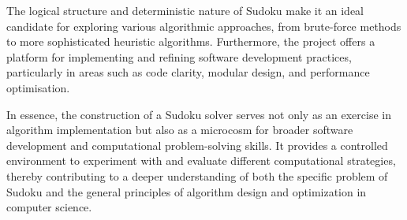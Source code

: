 \documentclass[11pt]{article}
\begin{document}
The logical structure and deterministic nature of Sudoku make it an ideal candidate for exploring various algorithmic approaches, from brute-force methods to more sophisticated heuristic algorithms. Furthermore, the project offers a platform for implementing and refining software development practices, particularly in areas such as code clarity, modular design, and performance optimisation.

In essence, the construction of a Sudoku solver serves not only as an exercise in algorithm implementation but also as a microcosm for broader software development and computational problem-solving skills. It provides a controlled environment to experiment with and evaluate different computational strategies, thereby contributing to a deeper understanding of both the specific problem of Sudoku and the general principles of algorithm design and optimization in computer science.
\end{document}
